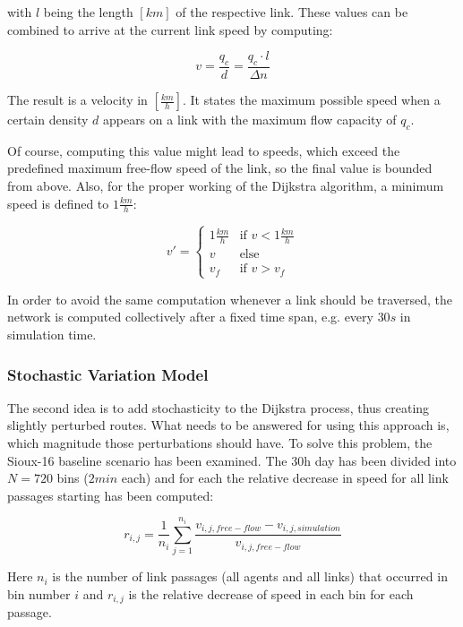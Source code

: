 with $l$ being the length $[km]$ of the respective link. These values can be combined
to arrive at the current link speed by computing:

\begin{equation}
v = \frac{q_c}{d} = \frac{q_c \cdot l}{\Delta n}
\end{equation}

The result is a velocity in $\left[ \frac{km}{h} \right]$.
It states the maximum possible speed when a certain density $d$ appears on
a link with the maximum flow capacity of $q_c$.

Of course, computing this value might lead to speeds, which exceed the predefined
maximum free-flow speed of the link, so the final value is bounded from above. Also,
for the proper working of the Dijkstra algorithm, a minimum speed is defined to
$1 \frac{km}{h}$:

\begin{equation}
v' = \begin{cases}
1 \frac{km}{h} & \text{if } v < 1 \frac{km}{h} \\
v & \text{else } \\
v_f & \text{if } v > v_f
\end{cases}
\end{equation}

In order to avoid the same computation whenever a link should be traversed, the
network is computed collectively after a fixed time span, e.g. every $30s$ in
simulation time.

\subsubsection{Stochastic Variation Model}
\label{sec:routing_variation}

The second idea is to add stochasticity to the Dijkstra process, thus creating
slightly perturbed routes. What needs to be answered for using this approach is,
which magnitude those perturbations should have. To solve this problem,
the Sioux-16 baseline scenario has been examined. The 30h day has been divided
into $N=720$ bins ($2min$ each) and for each the relative decrease in speed for
all link passages starting has been computed:

\begin{equation}
r_{i,j} = \frac{1}{n_i} \sum_{j=1}^{n_i} \frac{v_{i,j,free-flow} - v_{i,j,simulation}}{v_{i,j,free-flow}}
\end{equation}

Here $n_i$ is the number of link passages (all agents and all links) that occurred
in bin number $i$ and $r_{i,j}$ is the relative decrease of speed in each bin for
each passage.

